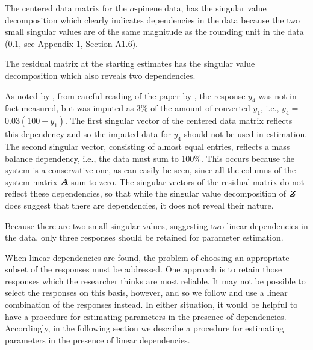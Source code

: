 \begin{example}\label{pin:4}
The centered data matrix for the $\alpha$-pinene data, has the
singular value decomposition
which clearly indicates dependencies in the data because
the two small singular values are of the same magnitude as
the rounding unit in the data (0.1, see Appendix 1, Section A1.6).

The residual matrix at the starting estimates has
the singular value decomposition
which also reveals two dependencies.

As noted by , from careful reading of the
paper by , the response $y_4 $ was
not in fact measured, but was imputed as 3\% of the
amount of converted $y_{1}$, i.e.,
$y_4=$ $0.03 ( 100 - y_1 )$.
The first singular vector of the centered data matrix reflects this
dependency and so
the imputed data for $y_4 $ should not be used in estimation.
The second singular vector, consisting of almost equal entries,
reflects a mass balance dependency, i.e., the data must sum to
100\%.
This occurs because the system is a conservative one, as can
easily be seen, since all the columns of the system matrix ${\boldsymbol A}$
sum to zero.
The singular vectors of the residual matrix do not reflect these
dependencies, so that while the singular value decomposition of ${\boldsymbol Z}$
does suggest that there are dependencies, it does not reveal their
nature.

Because there are two small singular values, suggesting two
linear dependencies in the data, only three responses
should be retained for parameter estimation.
\end{example}

When linear dependencies are found, the problem of
choosing an appropriate subset of the responses must be addressed.
One approach is to retain those responses which the researcher
thinks are most reliable.
It may not be possible to select the responses on this basis, however,
and so we follow  and use
a linear combination of the responses instead.
In either situation, it would be helpful to have a procedure for
estimating parameters in the presence of dependencies.
Accordingly, in the following section we describe a procedure for
estimating parameters in the presence of linear dependencies.

